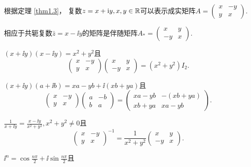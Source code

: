 \begin{mybox}
  \begin{problem}

  根据定理 \ref{thm1.3}， 复数$z=x+\mathrm i y,x,y\in\mathbb R$可以表示成实矩阵$A=\begin{pmatrix}
    x & -y \\
    y & x
  \end{pmatrix}$.
  \begin{enum}
    \item 相应于共轭复数$\bar z=x-\ii y$的矩阵是伴随矩阵$A_\ast=\begin{pmatrix}
          x & y \\
          -y & x
        \end{pmatrix}$.
    \item $(x+\ii y)(x-\ii y)=x^2+y^2$且
      \[
        \begin{pmatrix}
          x & -y \\
          y & x
        \end{pmatrix}\begin{pmatrix}
          x & y \\
          -y & x
        \end{pmatrix} = (x^2+y^2)I_2.
      \]
    \item $(x+\ii y)(a+\ii b)=xa-yb+\ii(xb+ya)$且
      \[
        \begin{pmatrix}
          x & -y \\
          y & x
        \end{pmatrix}\begin{pmatrix}
          a & -b \\
          b & a
        \end{pmatrix} = \begin{pmatrix}
          xa - yb & -(xb + ya) \\
          xb + ya & xa - yb
        \end{pmatrix}.
      \]
    \item $\frac1{x+\ii y}=\frac{x-\ii y}{x^2+y^2},x^2+y^2\ne0$且
      \[
        \begin{pmatrix}
          x & -y \\
          y & x
        \end{pmatrix}^{-1} = \frac1{x^2+y^2}\begin{pmatrix}
          x & y \\
          -y & x
        \end{pmatrix}.
      \]
    \item $\ii^n=\cos\frac{n\pi}2+\ii\sin\frac{n\pi}2$且

\end{enum}
\end{problem}
\end{mybox}
